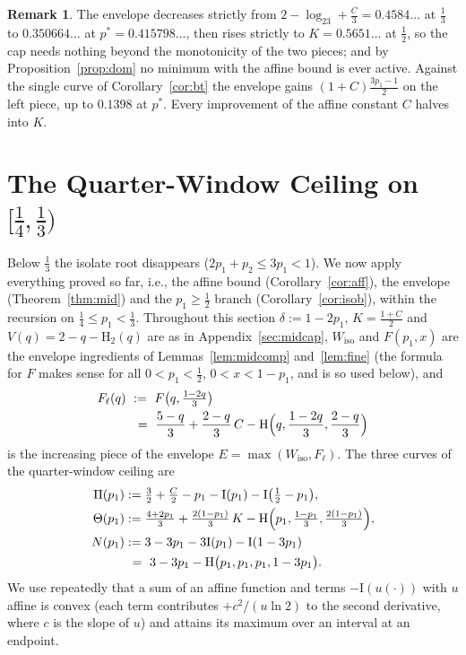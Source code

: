 \documentclass[journal]{IEEEtran}
\theoremstyle{definition}
\newtheorem{remark}{Remark}
\newcommand{\Hh}{\mathrm H_2}
\newcommand{\lgg}{\log_2}
\newcommand{\CC}{C}
\begin{document}
\begin{remark}\label{rem:midquality}
The envelope decreases strictly from $2-\lgg3+\tfrac{\CC}3=0.4584\ldots$ at
$\tfrac13$ to $0.350664\ldots$ at $p^*=0.415798\ldots$, then rises strictly
to $K=0.5651\ldots$ at $\tfrac12$, so the cap needs nothing beyond the
monotonicity of the two pieces; and by Proposition~\ref{prop:dom} no minimum
with the affine bound is ever active. Against the single curve of
Corollary~\ref{cor:bt} the envelope gains $(1+\CC)\tfrac{3p_1-1}2$ on the
left piece, up to $0.1398$ at $p^*$. Every improvement of the affine constant
$\CC$ halves into $K$.
\end{remark}

\section{The Quarter-Window Ceiling on $[\tfrac14,\tfrac13)$}\label{sec:quarter}

Below $\tfrac13$ the isolate root disappears ($2p_1+p_2\le3p_1<1$). We now
apply everything proved so far, i.e., the affine bound
(Corollary~\ref{cor:aff}), the envelope (Theorem~\ref{thm:mid}) and the
$p_1\ge\tfrac12$ branch (Corollary~\ref{cor:isob}), within the recursion on
$\tfrac14\le p_1<\tfrac13$. Throughout this section $\delta:=1-2p_1$,
$K=\tfrac{1+\CC}2$ and $V(q)=2-q-\Hh(q)$ are as in
Appendix~\ref{sec:midcap}, $W_{\mathrm{iso}}$ and $F(p_1,x)$ are the
envelope ingredients of Lemmas~\ref{lem:midcomp} and~\ref{lem:fine}
(the formula for $F$ makes sense for all $0<p_1<\tfrac12$, $0<x<1-p_1$,
and is so used below), and
\[
\begin{aligned}
  F_\ell(q)\ &:=\ F\bigl(q,\tfrac{1-2q}3\bigr)\\
  &\ =\ \frac{5-q}{3}+\frac{2-q}{3}\,\CC
  -\mathrm H\Bigl(q,\frac{1-2q}{3},\frac{2-q}{3}\Bigr)
\end{aligned}
\]
is the increasing piece of the envelope
$E=\max(W_{\mathrm{iso}},F_\ell)$. The three curves of the quarter-window ceiling
are
\begin{align*}
  \Pi(p_1)&:=\tfrac32+\tfrac{\CC}2-p_1-\mathrm I(p_1)-\mathrm I\bigl(\tfrac12-p_1\bigr),\\
  \Theta(p_1)&:=\tfrac{4+2p_1}{3}+\tfrac{2(1-p_1)}{3}\,K
   -\mathrm H\Bigl(p_1,\tfrac{1-p_1}{3},\tfrac{2(1-p_1)}{3}\Bigr),\\
  N(p_1)&:=3-3p_1-3\mathrm I(p_1)-\mathrm I(1-3p_1)\\
   &\ =\ 3-3p_1-\mathrm H\bigl(p_1,p_1,p_1,1-3p_1\bigr).
\end{align*}
We use repeatedly that a sum of an affine function and terms
$-\mathrm I(u(\cdot))$ with $u$ affine is convex (each term contributes
$+c^2/(u\ln2)$ to the second derivative, where $c$ is the slope of $u$) and attains
its maximum over an interval at an endpoint.
\end{document}
